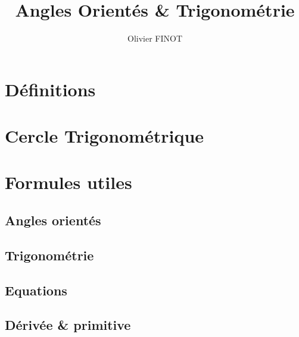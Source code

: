 \documentclass[12pt,a4paper]{article}
\author{Olivier FINOT}
\date{}
\title{Angles Orientés \& Trigonométrie }
\begin{document}
\maketitle



\section{Définitions}
%
	

%

\section{Cercle Trigonométrique}

\begin{center}

\end{center}
%
%
\section{Formules utiles}
%
\subsection*{Angles orientés}
%

%
%
\subsection*{Trigonométrie}
%




\subsection*{Equations}


\subsection*{Dérivée \& primitive}


%
%
%
%
%
%
%
%
\end{document}
